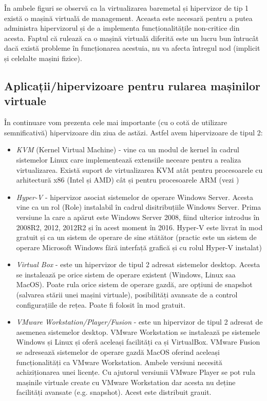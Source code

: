 În ambele figuri se observă ca la virtualizarea baremetal și hipervizor de tip 1
există o mașină virtuală de management. Aceasta este necesară pentru a putea
administra hipervizorul și de a implementa funcționalitățile non-critice din
acesta. Faptul că rulează ca o mașină virtuală diferită este un lucru bun
întrucât dacă există probleme în funcționarea acestuia, nu va afecta întregul
nod (implicit și celelalte mașini fizice).

\subsection{Aplicații/hipervizoare pentru rularea mașinilor virtuale}
\label{sec:vm-intro-apps}

În continuare vom prezenta cele mai importante (cu o cotă de utilizare
semnificativă) hipervizoare din ziua de astăzi. Astfel avem hipervizoare de
tipul 2:

\begin{itemize}
	\item \textit{KVM}  (Kernel Virtual
		Machine) - vine ca un modul de kernel în cadrul sistemelor Linux
		care implementează extensiile neceare pentru a realiza
		virtualizarea. Există suport de virtualizarea KVM atât pentru
		procesoarele cu arhitectură x86 (Intel și AMD) cât și pentru
		procesoarele ARM (vezi
		)
	\item \textit{Hyper-V} - hipervizor asociat sistemelor de operare
		Windows Server. Acesta vine ca un rol (Role) instalabil în
		cadrul disitribuțiile Windows Server. Prima versiune la care a
		apărut este Windows Server 2008, fiind ulterior introdus în
		2008R2, 2012, 2012R2 și în acest moment în 2016. Hyper-V este
		livrat în mod gratuit și ca un sistem de operare de sine
		stătător (practic este un sistem de operare Microsoft Windows
		fără interfață grafică și cu rolul Hyper-V instalat)
	\item \textit{Virtual Box} - este un hipervizor de tipul 2 adresat
		sistemelor desktop. Acesta se instalează pe orice sistem de
		operare existent (Windows, Linux saa MacOS). Poate rula orice
		sistem de operare gazdă, are opțiuni de snapshot (salvarea
		stării unei mașini virtuale), posibilități avansate de a control
		configurațiile de rețea. Poate fi folosit în mod gratuit.
	\item \textit{VMware Workstation/Player/Fusion} - este un hipervizor de
		tipul 2 adresat de asemenea sistemelor desktop. VMware
		Workstation se instalează pe sistemele Windows și Linux și oferă
		aceleași facilități ca și VirtualBox. VMware Fusion se adresează
		sistemelor de operare gazdă MacOS oferind aceleași
		funcționalități ca VMware Workstation. Ambele versiuni necesită
		achiziționarea unei licențe. Cu ajutorul versiunii VMware Player
		se pot rula mașinile virtuale create cu VMware Workstation dar
		acesta nu deține facilități avansate (e.g. snapshot). Acest este
		distribuit grauit.
\end{itemize}

